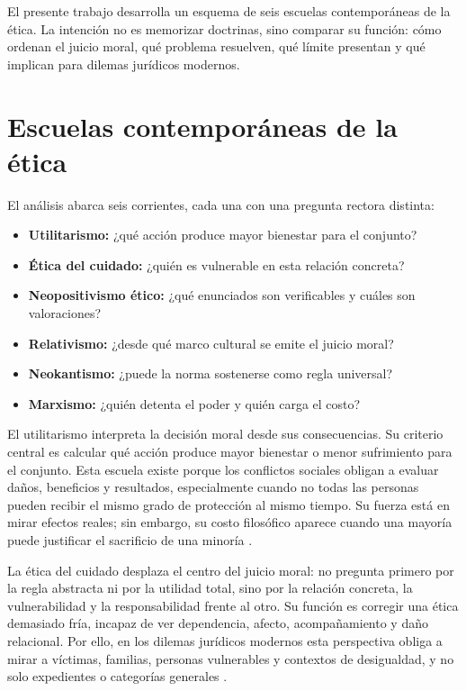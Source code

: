 \documentclass[
	spanish, %
	letterpaper, oneside
]{article}
\begin{document}
El presente trabajo desarrolla un esquema de seis escuelas contemporáneas de la ética. La intención no es memorizar doctrinas, sino comparar su función: cómo ordenan el juicio moral, qué problema resuelven, qué límite presentan y qué implican para dilemas jurídicos modernos.

\section{Escuelas contemporáneas de la ética}

El análisis abarca seis corrientes, cada una con una pregunta rectora distinta:

\begin{itemize}
  \item \textbf{Utilitarismo:} ¿qué acción produce mayor bienestar para el conjunto?
  \item \textbf{Ética del cuidado:} ¿quién es vulnerable en esta relación concreta?
  \item \textbf{Neopositivismo ético:} ¿qué enunciados son verificables y cuáles son valoraciones?
  \item \textbf{Relativismo:} ¿desde qué marco cultural se emite el juicio moral?
  \item \textbf{Neokantismo:} ¿puede la norma sostenerse como regla universal?
  \item \textbf{Marxismo:} ¿quién detenta el poder y quién carga el costo?
\end{itemize}

El utilitarismo interpreta la decisión moral desde sus consecuencias. Su criterio central es calcular qué acción produce mayor bienestar o menor sufrimiento para el conjunto. Esta escuela existe porque los conflictos sociales obligan a evaluar daños, beneficios y resultados, especialmente cuando no todas las personas pueden recibir el mismo grado de protección al mismo tiempo. Su fuerza está en mirar efectos reales; sin embargo, su costo filosófico aparece cuando una mayoría puede justificar el sacrificio de una minoría \citep{ronquilloarmasEticaGeneralProfesional2018,singerCompendioEtica1995}.

La ética del cuidado desplaza el centro del juicio moral: no pregunta primero por la regla abstracta ni por la utilidad total, sino por la relación concreta, la vulnerabilidad y la responsabilidad frente al otro. Su función es corregir una ética demasiado fría, incapaz de ver dependencia, afecto, acompañamiento y daño relacional. Por ello, en los dilemas jurídicos modernos esta perspectiva obliga a mirar a víctimas, familias, personas vulnerables y contextos de desigualdad, y no solo expedientes o categorías generales \citep{singerCompendioEtica1995}.
\end{document}

